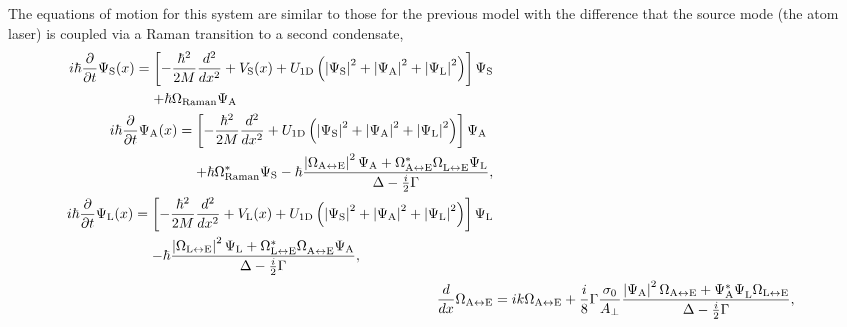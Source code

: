 The equations of motion for this system are similar to those for the previous model with the difference that the source mode (the atom laser) is coupled via a Raman transition to a second condensate,
\begin{subequations}
    \label{OpticalPumping:TravellingBeamEvolution}
    \begin{align}
        \begin{split}
            i \hbar \frac{\partial}{\partial t} \Psi_\text{S}(x) &= \left[ - \frac{\hbar^2}{2M} \frac{d^2}{dx^2} + V_\text{S}(x) + U_\text{1D}\left(\abs{\Psi_\text{S}}^2 + \abs{\Psi_\text{A}}^2 + \abs{\Psi_\text{L}}^2\right) \right] \Psi_\text{S}\\
            &\relphantom{=} +\hbar \Omega_\text{Raman} \Psi_\text{A}
        \end{split} \label{OpticalPumping:TravellingBeamEvolution:CondensatesEvolution:PsiS}\\
        \begin{split}
            i \hbar \frac{\partial}{\partial t} \Psi_\text{A}(x) &= \left[- \frac{\hbar^2}{2M}\frac{d^2}{dx^2} + U_\text{1D}\left(\abs{\Psi_\text{S}}^2 + \abs{\Psi_\text{A}}^2 + \abs{\Psi_\text{L}}^2\right)  \right] \Psi_\text{A}\\
            &\relphantom{=} + \hbar \Omega^*_\text{Raman} \Psi_\text{S} - \hbar \frac{\abs{\Omega_{\text{A}\leftrightarrow\text{E}}}^2\Psi_\text{A} + \Omega_{\text{A}\leftrightarrow\text{E}}^* \Omega_{\text{L}\leftrightarrow\text{E}}^{\phantom{*}}\Psi_\text{L}}{\Delta - \frac{i}{2} \Gamma},
        \end{split} \label{OpticalPumping:TravellingBeamEvolution:CondensatesEvolution:PsiA}\\
        \begin{split}
            i \hbar \frac{\partial}{\partial t} \Psi_\text{L}(x) &= \left[- \frac{\hbar^2}{2M}\frac{d^2}{dx^2} + V_\text{L}(x) + U_\text{1D}\left(\abs{\Psi_\text{S}}^2 + \abs{\Psi_\text{A}}^2 + \abs{\Psi_\text{L}}^2\right)  \right] \Psi_\text{L}\\
            &\relphantom{=} - \hbar \frac{\abs{\Omega_{\text{L}\leftrightarrow\text{E}}}^2 \Psi_\text{L} + \Omega_{\text{L}\leftrightarrow\text{E}}^* \Omega_{\text{A}\leftrightarrow\text{E}}^{\phantom{*}} \Psi_\text{A}}{\Delta - \frac{i}{2} \Gamma},
        \end{split} \label{OpticalPumping:TravellingBeamEvolution:PsiL}\\
        \frac{d}{dx} \Omega_{\text{A}\leftrightarrow\text{E}} &= i k \Omega_{\text{A}\leftrightarrow\text{E}} + \frac{i}{8} \Gamma \frac{\sigma_0}{A_\perp} \frac{\abs{\Psi_\text{A}}^2 \Omega_{\text{A}\leftrightarrow\text{E}} + \Psi_\text{A}^* \Psi_\text{L}^{\phantom{*}}\Omega_{\text{L}\leftrightarrow\text{E}}}{\Delta - \frac{i}{2} \Gamma}, \label{OpticalPumping:TravellingBeamEvolution:OmegaA}\\

\end{align}
\end{subequations}
